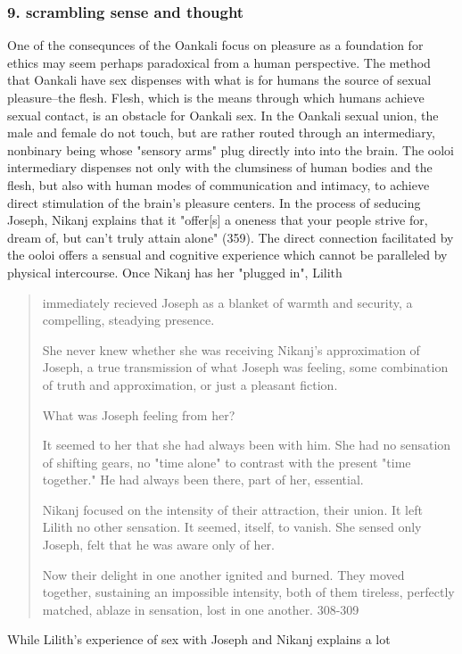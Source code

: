 \documentclass[11pt]{article}
\begin{document}
\subsubsection{9. scrambling sense and thought}
\label{sec:org9df3466}
One of the consequnces of the Oankali focus on pleasure as a
foundation for ethics may seem perhaps paradoxical from a human
perspective. The method that Oankali have sex dispenses with what is
for humans the source of sexual pleasure--the flesh. Flesh, which is
the means through which humans achieve sexual contact, is an obstacle
for Oankali sex. In the Oankali sexual union, the male and female do
not touch, but are rather routed through an intermediary, nonbinary
being whose "sensory arms" plug directly into into the brain. The
ooloi intermediary dispenses not only with the clumsiness of human
bodies and the flesh, but also with human modes of communication and
intimacy, to achieve direct stimulation of the brain's pleasure
centers. In the process of seducing Joseph, Nikanj explains that it
"offer[s] a oneness that your people strive for, dream of, but can't
truly attain alone" (359). The direct connection facilitated by the
ooloi offers a sensual and cognitive experience which cannot be
paralleled by physical intercourse. Once Nikanj has her "plugged in",
Lilith
\begin{quote}
immediately recieved Joseph as a blanket of warmth and security, a
compelling, steadying presence. 

She never knew whether she was receiving Nikanj's approximation of
Joseph, a true transmission of what Joseph was feeling, some
combination of truth and approximation, or just a pleasant fiction. 

What was Joseph feeling from her?

It seemed to her that she had always been with him. She had no
sensation of shifting gears, no "time alone" to contrast with the
present "time together." He had always been there, part of her,
essential. 

Nikanj focused on the intensity of their attraction, their union. It
left Lilith no other sensation. It seemed, itself, to vanish. She
sensed only Joseph, felt that he was aware only of her. 

Now their delight in one another ignited and burned. They moved
together, sustaining an impossible intensity, both of them tireless,
perfectly matched, ablaze in sensation, lost in one another. 308-309
\end{quote}
While Lilith's experience of sex with Joseph and Nikanj explains a lot
\end{document}
